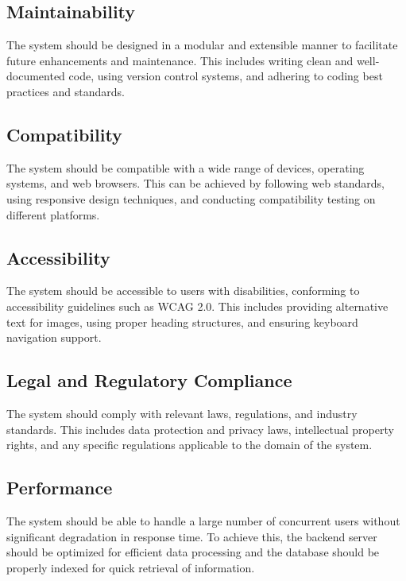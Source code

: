 \subsection{Maintainability}
The system should be designed in a modular and extensible manner to facilitate future enhancements and maintenance. This includes writing clean and well-documented code, using version control systems, and adhering to coding best practices and standards.

\subsection{Compatibility}
The system should be compatible with a wide range of devices, operating systems, and web browsers. This can be achieved by following web standards, using responsive design techniques, and conducting compatibility testing on different platforms.

\subsection{Accessibility}
The system should be accessible to users with disabilities, conforming to accessibility guidelines such as WCAG 2.0. This includes providing alternative text for images, using proper heading structures, and ensuring keyboard navigation support.

\subsection{Legal and Regulatory Compliance}
The system should comply with relevant laws, regulations, and industry standards. This includes data protection and privacy laws, intellectual property rights, and any specific regulations applicable to the domain of the system.

\subsection{Performance}
The system should be able to handle a large number of concurrent users without significant degradation in response time. To achieve this, the backend server should be optimized for efficient data processing and the database should be properly indexed for quick retrieval of information.
